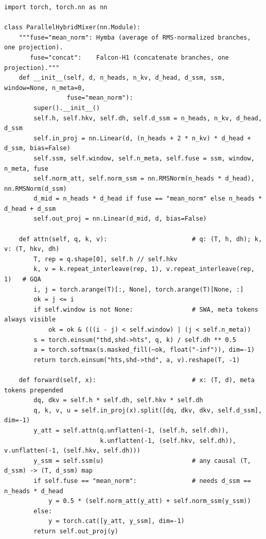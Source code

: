 \begin{lstlisting}[caption={Reference implementation (ours): a parallel-head hybrid mixer (Hymba / Falcon-H1 style).},label={lst:c12-parallel}]
import torch, torch.nn as nn

class ParallelHybridMixer(nn.Module):
    """fuse="mean_norm": Hymba (average of RMS-normalized branches, one projection).
       fuse="concat":    Falcon-H1 (concatenate branches, one projection)."""
    def __init__(self, d, n_heads, n_kv, d_head, d_ssm, ssm, window=None, n_meta=0,
                 fuse="mean_norm"):
        super().__init__()
        self.h, self.hkv, self.dh, self.d_ssm = n_heads, n_kv, d_head, d_ssm
        self.in_proj = nn.Linear(d, (n_heads + 2 * n_kv) * d_head + d_ssm, bias=False)
        self.ssm, self.window, self.n_meta, self.fuse = ssm, window, n_meta, fuse
        self.norm_att, self.norm_ssm = nn.RMSNorm(n_heads * d_head), nn.RMSNorm(d_ssm)
        d_mid = n_heads * d_head if fuse == "mean_norm" else n_heads * d_head + d_ssm
        self.out_proj = nn.Linear(d_mid, d, bias=False)

    def attn(self, q, k, v):                       # q: (T, h, dh); k, v: (T, hkv, dh)
        T, rep = q.shape[0], self.h // self.hkv
        k, v = k.repeat_interleave(rep, 1), v.repeat_interleave(rep, 1)   # GQA
        i, j = torch.arange(T)[:, None], torch.arange(T)[None, :]
        ok = j <= i
        if self.window is not None:                # SWA, meta tokens always visible
            ok = ok & (((i - j) < self.window) | (j < self.n_meta))
        s = torch.einsum("thd,shd->hts", q, k) / self.dh ** 0.5
        a = torch.softmax(s.masked_fill(~ok, float("-inf")), dim=-1)
        return torch.einsum("hts,shd->thd", a, v).reshape(T, -1)

    def forward(self, x):                          # x: (T, d), meta tokens prepended
        dq, dkv = self.h * self.dh, self.hkv * self.dh
        q, k, v, u = self.in_proj(x).split([dq, dkv, dkv, self.d_ssm], dim=-1)
        y_att = self.attn(q.unflatten(-1, (self.h, self.dh)),
                          k.unflatten(-1, (self.hkv, self.dh)), v.unflatten(-1, (self.hkv, self.dh)))
        y_ssm = self.ssm(u)                        # any causal (T, d_ssm) -> (T, d_ssm) map
        if self.fuse == "mean_norm":               # needs d_ssm == n_heads * d_head
            y = 0.5 * (self.norm_att(y_att) + self.norm_ssm(y_ssm))
        else:
            y = torch.cat([y_att, y_ssm], dim=-1)
        return self.out_proj(y)
\end{lstlisting}

